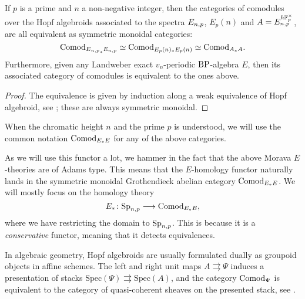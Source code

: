\begin{proposition}
    If $p$ is a prime and $n$ a non-negative integer, then the categories of comodules over the Hopf algebroids associated to the spectra $E_{n,p}$, $E_p(n)$ and $A = E_{n,p}^{h\mathbb{F}_p^\times}$, are all equivalent as symmetric monoidal categories: 
    \[\mathrm{Comod}_{E{_{n,p}}_*E_{n,p}}\simeq \mathrm{Comod}_{E_p(n)_*E_p(n)}\simeq \mathrm{Comod}_{A_*A}.\]
    Furthermore, given any Landweber exact $v_n$-periodic $\mathrm{BP}$-algebra $E$, then its associated category of comodules is equivalent to the ones above. 
\end{proposition}
\begin{proof}
    The equivalence is given by induction along a weak equivalence of Hopf algebroid, see \cite[4.2, 6.5]{hovey-strickland_2005a}; these are always symmetric monoidal. 
\end{proof}

\begin{notation}
    When the chromatic height $n$ and the prime $p$ is understood, we will use the common notation $\mathrm{Comod}_{E_*E}$ for any of the above categories. 
\end{notation}

\begin{example}
    \label{ch0:ex:E-homology-functor}
    As we will use this functor a lot, we hammer in the fact that the above Morava $E$-theories are of Adams type. This means that the $E$-homology functor naturally lands in the symmetric monoidal Grothendieck abelian category $\mathrm{Comod}_{E_*E}$. We will mostly focus on the homology theory
    \[E_*\colon \mathrm{Sp}_{n,p} \longrightarrow \mathrm{Comod}_{E_*E},\]
    where we have restricting the domain to $\mathrm{Sp}_{n,p}$. This is because it is a \emph{conservative} functor, meaning that it detects equivalences. 
\end{example}

\begin{remark}
    \label{ch0:rm:presenting-stacks}
    In algebraic geometry, Hopf algebroids are usually formulated dually as groupoid objects in affine schemes. The left and right unit maps $A\rightrightarrows \Psi$ induces a presentation of stacks $\mathrm{Spec}(\Psi)\rightrightarrows \mathrm{Spec}(A)$, and the category $\mathrm{Comod}_\Psi$ is equivalent to the category of quasi-coherent sheaves on the presented stack, see \cite[Thm 8]{naumann_07}. 
\end{remark}

